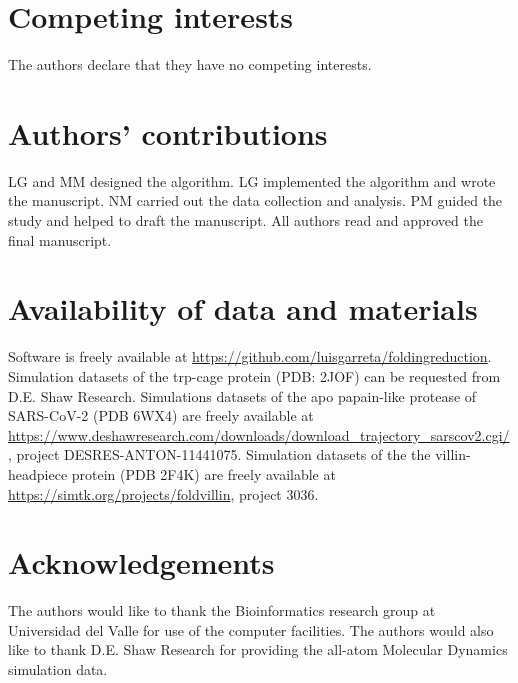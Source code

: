 \documentclass[twocolumn]{bmcart}%
\begin{document}
\begin{backmatter}

\section*{Competing interests}
The authors declare that they have no competing interests.

\section*{Authors’ contributions }
LG and MM designed the algorithm. LG implemented the algorithm and wrote the manuscript. NM carried out the data collection and analysis. PM guided the study and helped to draft the manuscript. All authors read and approved the final manuscript.

\section*{Availability of data and materials}
Software is freely available at \url{https://github.com/luisgarreta/foldingreduction}. Simulation datasets of the trp-cage protein (PDB: 2JOF) can be requested from D.E. Shaw Research. Simulations datasets of the apo papain-like protease of SARS-CoV-2 (PDB 6WX4) are freely available at \url{https://www.deshawresearch.com/downloads/download_trajectory_sarscov2.cgi/}, project DESRES-ANTON-11441075. Simulation datasets of the the villin-headpiece protein (PDB 2F4K) are freely available at \url{https://simtk.org/projects/foldvillin}, project 3036.

\section*{Acknowledgements}
The authors would like to thank the Bioinformatics research group at Universidad del Valle for use of the computer facilities. The authors would also like to thank D.E. Shaw Research for providing the all-atom Molecular Dynamics simulation data.



\end{backmatter}
\end{document}
